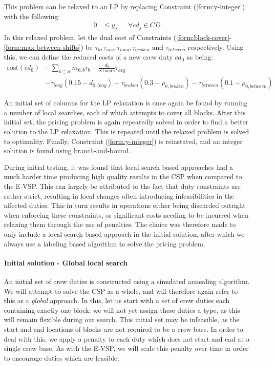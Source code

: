 \documentclass[]{article}
\begin{document}
This problem can be relaxed to an LP by replacing Constraint (\ref{form:y-integer}) with the following:
\begin{align}
0 &\leq y_{j} && \forall cd_j \in \textit{CD}
\end{align}
In this relaxed problem, let the dual cost of Constraints (\ref{form:block-cover}-\ref{form:max-between-shifts}) be $\tau_{b}, \tau_{\textit{avg}}, \tau_{\textit{long}}, \tau_{\textit{broken}}$ and $\tau_{\textit{between}}$ respectively. Using this, we can define the reduced costs of a new crew duty $cd_0$ as being: 
\begin{align}
\text{cost}(cd_0) 
&- \sum_{b \in B} m_{0,b} \tau_{b} 
- \frac{d_0}{\text{8 hours}} \tau_{\textit{avg}} \nonumber \\
&- \tau_{\textit{long}} (0.15 - d_{0,\textit{long}}) 
- \tau_{\textit{broken}} (0.3 - \rho_{0,\textit{broken}}) 
- \tau_{\textit{between}} (0.1 - \rho_{0,\textit{between}})
\end{align}

An initial set of columns for the LP relaxation is once again be found by running a number of local searches, each of which attempts to cover all blocks. After this initial set, the pricing problem is again repeatedly solved in order to find a better solution to the LP relaxation. This is repeated until the relaxed problem is solved to optimality. Finally, Constraint (\ref{form:y-integer}) is reinstated, and an integer solution is found using branch-and-bound.

During initial testing, it was found that local search based approaches had a much harder time producing high quality results in the CSP when compared to the E-VSP. This can largely be attributed to the fact that duty constraints are rather strict, resulting in local changes often introducing infeasibilities in the affected duties. This in turn results in operations either being discarded outright when enforcing these constraints, or significant costs needing to be incurred when relaxing them through the use of penalties. The choice was therefore made to only include a local search based approach in the initial solution, after which we always use a labeling based algorithm to solve the pricing problem.   

\paragraph{Initial solution - Global local search}
An initial set of crew duties is constructed using a simulated annealing algorithm. We will attempt to solve the CSP as a whole, and will therefore again refer to this as a \emph{global} approach. In this, let us start with a set of crew duties each containing exactly one block; we will not yet assign these duties a type, as this will remain flexible during our search. This initial set may be infeasible, as the start and end locations of blocks are not required to be a crew base. In order to deal with this, we apply a penalty to each duty which does not start and end at a single crew base. As with the E-VSP, we will scale this penalty over time in order to encourage duties which are feasible. 
\end{document}
